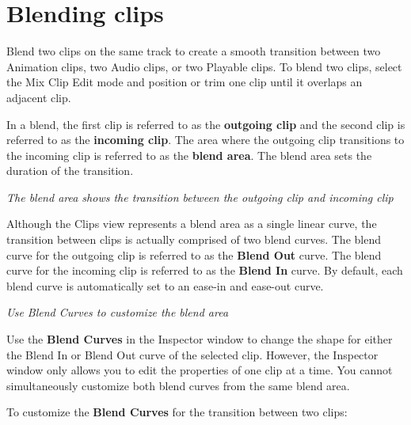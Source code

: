 \chapter{Blending clips}
\hypertarget{md__hey_tea_9_2_library_2_package_cache_2com_8unity_8timeline_0d1_87_85_2_documentation_0i_2clp__blend}{}\label{md__hey_tea_9_2_library_2_package_cache_2com_8unity_8timeline_0d1_87_85_2_documentation_0i_2clp__blend}
\label{md__hey_tea_9_2_library_2_package_cache_2com_8unity_8timeline_0d1_87_85_2_documentation_0i_2clp__blend_autotoc_md4609}%
%
 Blend two clips on the same track to create a smooth transition between two Animation clips, two Audio clips, or two Playable clips. To blend two clips, select the Mix Clip Edit mode and position or trim one clip until it overlaps an adjacent clip.

In a blend, the first clip is referred to as the {\bfseries{outgoing clip}} and the second clip is referred to as the {\bfseries{incoming clip}}. The area where the outgoing clip transitions to the incoming clip is referred to as the {\bfseries{blend area}}. The blend area sets the duration of the transition.



{\itshape The blend area shows the transition between the outgoing clip and incoming clip}

Although the Clips view represents a blend area as a single linear curve, the transition between clips is actually comprised of two blend curves. The blend curve for the outgoing clip is referred to as the {\bfseries{Blend Out}} curve. The blend curve for the incoming clip is referred to as the {\bfseries{Blend In}} curve. By default, each blend curve is automatically set to an ease-\/in and ease-\/out curve.



{\itshape Use Blend Curves to customize the blend area}

Use the {\bfseries{Blend Curves}} in the Inspector window to change the shape for either the Blend In or Blend Out curve of the selected clip. However, the Inspector window only allows you to edit the properties of one clip at a time. You cannot simultaneously customize both blend curves from the same blend area.

To customize the {\bfseries{Blend Curves}} for the transition between two clips\+:


